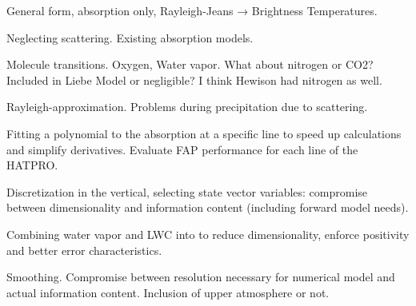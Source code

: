 \startsection[title=The Radiative Transfer Equation]

    General form, absorption only, Rayleigh-Jeans → Brightness Temperatures.

\stopsection


\startsection[title=Atmospheric Extinction]

    Neglecting scattering. Existing absorption models.

    \startsubsection[title=Gaseous Absorption]

        Molecule transitions. Oxygen, Water vapor. What about nitrogen or CO2?
        Included in Liebe Model or negligible? I think Hewison had nitrogen as
        well.

    \stopsubsection

    \startsubsection[title=Liquid Water Extinction]

        Rayleigh-approximation. Problems during precipitation due to
        scattering.

    \stopsubsection

    \startsubsection[title=Fast Absorption Prediction]

        Fitting a polynomial to the absorption at a specific line to speed up
        calculations and simplify derivatives. Evaluate FAP performance for
        each line of the HATPRO.

    \stopsubsection

\stopsection


\startsection[title=Representation of the Atmospheric State]

    Discretization in the vertical, selecting state vector variables:
    compromise between dimensionality and information content (including
    forward model needs).

    \startsubsection[title=The Choice of State Vector Variables]

        Combining water vapor and LWC into  to
        reduce dimensionality, enforce positivity and better error
        characteristics.

    \stopsubsection

    \startsubsection[title=Vertical Discretization and Interpolation]

        Smoothing. Compromise between resolution necessary for numerical model
        and actual information content. Inclusion of upper atmosphere or not.

    \stopsubsection

\stopsection


